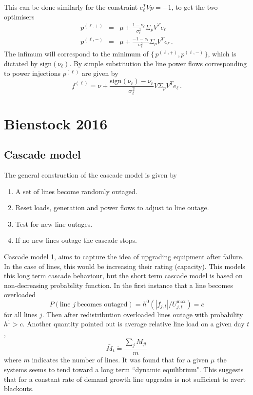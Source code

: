 \documentclass{article}
\begin{document}
This can be done similarly for the constraint $e_\ell^TVp =-1$, to get the two optimisers
\begin{eqnarray*}
p^{(\ell,+)} &=& \mu + \frac{1-\nu_\ell}{\sigma_{\ell}^2}\Sigma_pV^Te_\ell \\
p^{(\ell,-)} &=& \mu + \frac{-1-\nu_\ell}{\sigma_{\ell}^2}\Sigma_pV^Te_\ell\,.
\end{eqnarray*} 
The infimum will correspond to the minimum of $\{\,p^{(\ell,+)}, p^{(\ell,-)\,}\}$, which is dictated by $\text{sign}(\nu_\ell)$. By simple substitution the line power flows corresponding to power injections $p^{(\ell)}$ are given by 
\[f^{(\ell)} = \nu+\frac{\text{sign}(\nu_\ell)-\nu_\ell}{\sigma_{\ell}^2}V\Sigma_pV^Te_\ell\,.\]


\section{Bienstock 2016}

\subsection{Cascade model}

The general construction of the cascade model is given by
\begin{enumerate}
\item A set of lines become randomly outaged.
\item Reset loads, generation and power flows to adjust to line outage.
\item Test for new line outages.
\item If no new lines outage the cascade stops.
\end{enumerate}

Cascade model 1, aims to capture the idea of upgrading equipment after failure. In the case of lines, this would be increasing their rating (capacity). This models this long term cascade behaviour, but the short term cascade model is based on non-decreasing probability function. In the first instance that a line becomes overloaded
\begin{equation}
P(\text{line } j \ \text{becomes outaged}) = h^0(|f_{j,t}|/U_{j,t}^{\text{max}})=c
\end{equation}
for all lines $j$. Then after redistribution overloaded lines outage with probability $h^1>c$. Another quantity pointed out is average relative line load on a given day $t$,
\begin{equation}
\bar{M}_t \dot{=}\frac{\sum_j M_{jt}}{m}
\end{equation}
where $m$ indicates the number of lines. It was found that for a given $\mu$ the systems seems to tend toward a long term ``dynamic equilibrium". This suggests that for a constant rate of demand growth line upgrades is not sufficient to avert blackouts.\\
\end{document}
